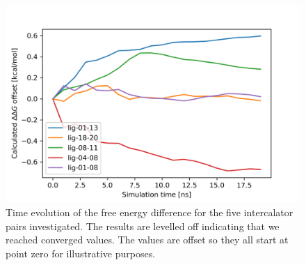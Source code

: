 \begin{figure}
  \includegraphics[width=\columnwidth]{ties_conv.png}
  \caption{Time evolution of the free energy difference for the five intercalator pairs investigated. The results are levelled off indicating that we reached converged values. The values are offset so they all start at point zero for illustrative purposes.}
  \label{fig:ties_conv}
\end{figure}
